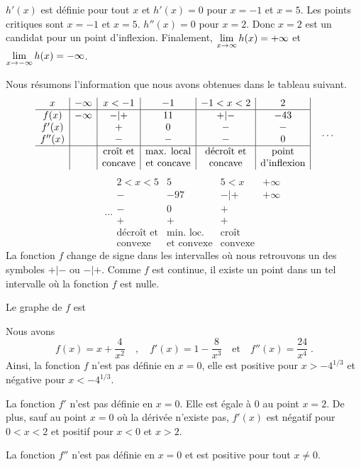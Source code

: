 {$h'(x)$ est définie pour tout $x$ et $h'(x) = 0$ pour $x=-1$ et $x=5$.
Les points critiques sont $x=-1$ et $x=5$.  $h''(x) = 0$ pour $x=2$.  Donc
$x=2$ est un candidat pour un point d'inflexion.  Finalement,
$\displaystyle \lim_{x\rightarrow \infty} h(x) = +\infty$ et
$\displaystyle \lim_{x\rightarrow -\infty} h(x) = -\infty$.

Nous résumons l'information que nous avons obtenues dans le tableau suivant.
\[
\begin{array}{c|c|c|c|c|c|}
x & -\infty & x<-1 & -1 & -1<x<2 & 2 \\
\hline
f(x) & -\infty & -|+ & 11 & +|- & -43 \\
f'(x) &  & + & 0 & - & - \\
f''(x) &  & - & - & - & 0 \\
\hline
& & \text{croît et} & \text{max. local} & \text{décroît et} & \text{point} \\
& & \text{concave} & \text{et concave} & \text{concave} & \text{d'inflexion}
\end{array} \quad \ldots
\]
\[
\qquad \ldots \begin{array}{|c|c|c|c}
2<x<5 & 5 & 5<x & +\infty \\
\hline
- & -97 & -|+ & +\infty \\
- & 0 & + & \\
+ & + & + & \\
\hline
\text{décroît et} & \text{min. loc.} & \text{croît} &  \\
\text{convexe} & \text{et convexe} & \text{convexe} &
\end{array}
\]
La fonction $f$ change de signe dans les intervalles où nous retrouvons un des
symboles $+|-$ ou $-|+$.  Comme $f$ est continue, il existe un point dans
un tel intervalle où la fonction $f$ est nulle.

Le graphe de $f$ est

 Nous avons
\[
f(x) = x + \frac{4}{x^2} \quad , \quad
f'(x) = 1 - \frac{8}{x^3} \quad \text{et} \quad f''(x) = \frac{24}{x^4} \; .
\]
Ainsi, la fonction $f$ n'est pas définie en $x=0$, elle est
positive pour $x > -4^{1/3}$ et négative pour $x<-4^{1/3}$.

La fonction $f'$ n'est pas définie en $x=0$.  Elle est égale à $0$ au point
$x=2$.  De plus, sauf au point $x=0$ où la dérivée n'existe pas,
$f'(x)$ est négatif pour $0<x<2$ et positif pour $x<0$ et $x>2$.

La fonction $f''$ n'est pas définie en $x=0$ et est positive pour tout
$x\neq 0$.

}
